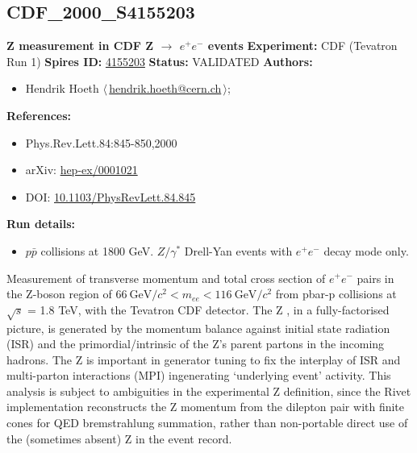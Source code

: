 \subsection[CDF\_2000\_S4155203]{CDF\_2000\_S4155203\,\cite{Affolder:1999jh}}
\textbf{Z \pT measurement in CDF Z \ensuremath{\to} $e^+e^-$ events}\newline
\textbf{Experiment:} CDF (Tevatron Run 1) \newline
\textbf{Spires ID:} \href{http://www.slac.stanford.edu/spires/find/hep/www?rawcmd=key+4155203}{4155203}\newline
\textbf{Status:} VALIDATED\newline
\textbf{Authors:}
\begin{itemize}
  \item Hendrik Hoeth $\langle\,$\href{mailto:hendrik.hoeth@cern.ch}{hendrik.hoeth@cern.ch}$\,\rangle$;
\end{itemize}
\textbf{References:}
\begin{itemize}
  \item Phys.Rev.Lett.84:845-850,2000
  \item arXiv: \href{http://arxiv.org/abs/hep-ex/0001021}{hep-ex/0001021}
  \item DOI: \href{http://dx.doi.org/10.1103/PhysRevLett.84.845}{10.1103/PhysRevLett.84.845}
\end{itemize}
\textbf{Run details:}
\begin{itemize}

  \item $p\bar{p}$ collisions at 1800 GeV. $Z/\gamma^*$ Drell-Yan events with $e^+e^-$ decay mode only.\end{itemize}

\noindent Measurement of transverse momentum and total cross section of $e^+e^-$ pairs in the Z-boson region of $66~\text{GeV}/c^2 < m_{ee} < 116~\text{GeV}/c^2$ from pbar-p collisions at \ensuremath{\sqrt{s}} = 1.8 TeV, with the Tevatron CDF detector.  The Z \pT, in a fully-factorised picture, is generated by the momentum balance against initial state radiation (ISR) and the primordial/intrinsic \pT of the Z's parent partons in the incoming hadrons. The Z \pT is important in generator tuning to fix the interplay of ISR and multi-parton interactions (MPI) ingenerating `underlying event' activity. 
This analysis is subject to ambiguities in the experimental Z \pT definition, since the Rivet implementation reconstructs the Z momentum from the dilepton pair with finite cones for QED bremstrahlung summation, rather than non-portable direct use of the (sometimes absent) Z in the event record.

